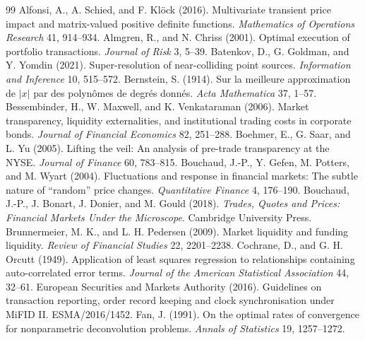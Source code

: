\begin{thebibliography}{99}\setlength{\itemsep}{2pt}\small
{} Alfonsi, A., A. Schied, and F. Kl\"ock (2016). Multivariate transient price impact and matrix-valued positive definite functions. \emph{Mathematics of Operations Research} 41, 914--934.
 Almgren, R., and N. Chriss (2001). Optimal execution of portfolio transactions. \emph{Journal of Risk} 3, 5--39.
 Batenkov, D., G. Goldman, and Y. Yomdin (2021). Super-resolution of near-colliding point sources. \emph{Information and Inference} 10, 515--572.
 Bernstein, S. (1914). Sur la meilleure approximation de $|x|$ par des polyn\^omes de degr\'es donn\'es. \emph{Acta Mathematica} 37, 1--57.
 Bessembinder, H., W. Maxwell, and K. Venkataraman (2006). Market transparency, liquidity externalities, and institutional trading costs in corporate bonds. \emph{Journal of Financial Economics} 82, 251--288.
 Boehmer, E., G. Saar, and L. Yu (2005). Lifting the veil: An analysis of pre-trade transparency at the NYSE. \emph{Journal of Finance} 60, 783--815.
 Bouchaud, J.-P., Y. Gefen, M. Potters, and M. Wyart (2004). Fluctuations and response in financial markets: The subtle nature of ``random'' price changes. \emph{Quantitative Finance} 4, 176--190.
 Bouchaud, J.-P., J. Bonart, J. Donier, and M. Gould (2018). \emph{Trades, Quotes and Prices: Financial Markets Under the Microscope}. Cambridge University Press.
 Brunnermeier, M. K., and L. H. Pedersen (2009). Market liquidity and funding liquidity. \emph{Review of Financial Studies} 22, 2201--2238.
 Cochrane, D., and G. H. Orcutt (1949). Application of least squares regression to relationships containing auto-correlated error terms. \emph{Journal of the American Statistical Association} 44, 32--61.
 European Securities and Markets Authority (2016). Guidelines on transaction reporting, order record keeping and clock synchronisation under MiFID II. ESMA/2016/1452.
 Fan, J. (1991). On the optimal rates of convergence for nonparametric deconvolution problems. \emph{Annals of Statistics} 19, 1257--1272.

\end{thebibliography}
